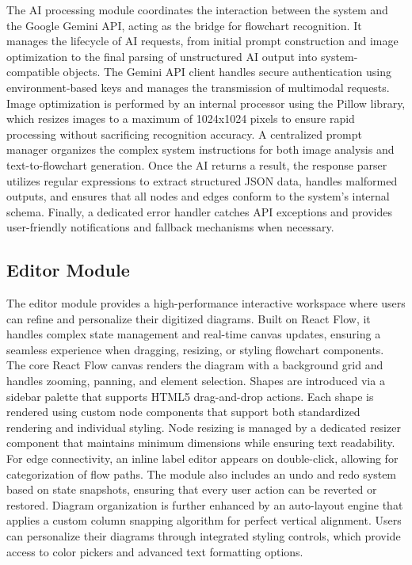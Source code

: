 \justifying
The AI processing module coordinates the interaction between the system and the Google Gemini API, acting as the bridge for flowchart recognition. It manages the lifecycle of AI requests, from initial prompt construction and image optimization to the final parsing of unstructured AI output into system-compatible objects. The Gemini API client handles secure authentication using environment-based keys and manages the transmission of multimodal requests. Image optimization is performed by an internal processor using the Pillow library, which resizes images to a maximum of 1024x1024 pixels to ensure rapid processing without sacrificing recognition accuracy. A centralized prompt manager organizes the complex system instructions for both image analysis and text-to-flowchart generation. Once the AI returns a result, the response parser utilizes regular expressions to extract structured JSON data, handles malformed outputs, and ensures that all nodes and edges conform to the system’s internal schema. Finally, a dedicated error handler catches API exceptions and provides user-friendly notifications and fallback mechanisms when necessary.

\subsection{Editor Module}

\justifying
The editor module provides a high-performance interactive workspace where users can refine and personalize their digitized diagrams. Built on React Flow, it handles complex state management and real-time canvas updates, ensuring a seamless experience when dragging, resizing, or styling flowchart components.
The core React Flow canvas renders the diagram with a background grid and handles zooming, panning, and element selection. Shapes are introduced via a sidebar palette that supports HTML5 drag-and-drop actions. Each shape is rendered using custom node components that support both standardized rendering and individual styling. Node resizing is managed by a dedicated resizer component that maintains minimum dimensions while ensuring text readability. For edge connectivity, an inline label editor appears on double-click, allowing for categorization of flow paths. The module also includes an undo and redo system based on state snapshots, ensuring that every user action can be reverted or restored. Diagram organization is further enhanced by an auto-layout engine that applies a custom column snapping algorithm for perfect vertical alignment. Users can personalize their diagrams through integrated styling controls, which provide access to color pickers and advanced text formatting options.

